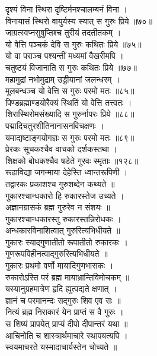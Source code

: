दृश्यं विना स्थिरा दृष्टिर्मनश्चालम्बनं विना ।\\[-2mm]
विनायासं स्थिरो वायुर्यस्य स्यात् स गुरुः प्रिये ॥७०॥\\
जाग्रत्स्वप्नसुषुप्तिश्च तुरीयं तदतीतकम् ।\\[-2mm]
यो वेत्ति पञ्चकं देवि स गुरुः कथितः प्रिये ॥७५॥\\
यो वा पराञ्च पश्यन्तीं मध्यमां वैखरीमपि ।\\[-2mm]
चतुष्टयं विजानाति स गुरुः कथितः प्रिये ॥७७॥\\
महामुद्रां नभोमुद्राम् उड्डीयानां जलन्धरम् ।\\[-2mm]
मूलबन्धञ्च यो वेत्ति स गुरुः परमो मतः ॥८५॥\\
पिण्डब्रह्माण्डयोरैक्यं स्थितिं यो वेत्ति तत्त्वतः ।\\[-2mm]
शिरास्थिरोमसंख्यादि स गुरुर्नापरः प्रिये ॥८८॥\\
पद्मादिचतुरशीतिनानासनविचक्षणः ।\\[-2mm]
यमाद्यष्टाङ्गयोगज्ञः स गुरुः परमो मतः ॥८९॥\\
प्रेरकः सूचकश्चैव वाचको दर्शकस्तथा ।\\[-2mm]
शिक्षको बोधकश्चैव षडेते गुरवः स्मृताः ॥१२८॥\\
 रूढाविद्या जगन्माया देहेस्ति ध्वान्तरूपिणी ।\\[-2mm]
तद्वारकः प्रकाशश्च गुरुशब्देन कथ्यते ॥\\
गुकारश्चान्धकारो हि रुकारस्तेज उच्यते ।\\[-2mm]
अज्ञानग्रासकं ब्रह्म गुरुरेव न संशयः ॥\\
गुकारश्चान्धकारस्तु  रुकारस्तन्निरोधकः ।\\[-2mm]
अन्धकारविनाशित्वात् गुरुरित्यभिधीयते ॥\\
गुकारः स्याद्गुणातीतो रूपातीतो रुकारकः ।\\[-2mm]
गुणरूपविहीनत्वाद्गुरुरित्यभिधीयते ॥\\
गुकारः प्रथमो वर्णो मायादिगुणभासकः ।\\[-2mm]
रुकारोऽस्ति परं ब्रह्म मायाभ्रान्तिविमोचकम् ॥\\
यस्यानुग्रहमात्रेण हृदि ह्युत्पद्यते क्षणात् ।\\[-2mm]
ज्ञानं च परमानन्दः सद्गुरुः शिव एव सः ॥\\
नित्यं ब्रह्म निराकारं येन प्राप्तं स वै गुरुः ।\\[-2mm]
स शिष्यं प्रापयेत् प्राप्यं दीपो दीपान्तरं यथा ॥\\
 आचिनोति च शास्त्रार्थमाचारे स्थापयत्यपि ।\\[-2mm]
स्वयमाचरते यस्मादाचार्यस्तेन चोच्यते ॥\\

